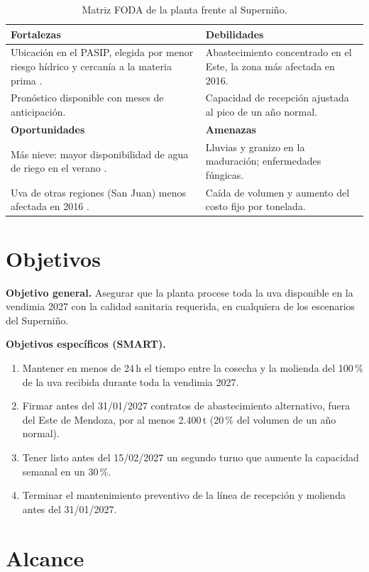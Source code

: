 \documentclass[runningheads]{llncs}
\begin{document}
\begin{table}
\caption{Matriz FODA de la planta frente al Superniño.}\label{tab:foda}
\centering
\begin{tabular}{L{5.7cm}L{5.7cm}}
\toprule
\textbf{Fortalezas} & \textbf{Debilidades}\\
\midrule
Ubicación en el PASIP, elegida por menor riesgo hídrico y cercanía a la materia prima \cite{sql}. & Abastecimiento concentrado en el Este, la zona más afectada en 2016.\\
Pronóstico disponible con meses de anticipación. & Capacidad de recepción ajustada al pico de un año normal.\\
\midrule
\textbf{Oportunidades} & \textbf{Amenazas}\\
\midrule
Más nieve: mayor disponibilidad de agua de riego en el verano \cite{ianigla}. & Lluvias y granizo en la maduración; enfermedades fúngicas.\\
Uva de otras regiones (San Juan) menos afectada en 2016 \cite{sanjuan}. & Caída de volumen y aumento del costo fijo por tonelada.\\
\bottomrule
\end{tabular}
\end{table}

\section{Objetivos}

\textbf{Objetivo general.} Asegurar que la planta procese toda la uva disponible en la vendimia 2027 con la calidad sanitaria requerida, en cualquiera de los escenarios del Superniño.

\textbf{Objetivos específicos (SMART).}
\begin{enumerate}
\item Mantener en menos de 24\,h el tiempo entre la cosecha y la molienda del 100\,\% de la uva recibida durante toda la vendimia 2027.
\item Firmar antes del 31/01/2027 contratos de abastecimiento alternativo, fuera del Este de Mendoza, por al menos 2.400\,t (20\,\% del volumen de un año normal).
\item Tener listo antes del 15/02/2027 un segundo turno que aumente la capacidad semanal en un 30\,\%.
\item Terminar el mantenimiento preventivo de la línea de recepción y molienda antes del 31/01/2027.
\end{enumerate}

\section{Alcance}
\end{document}

